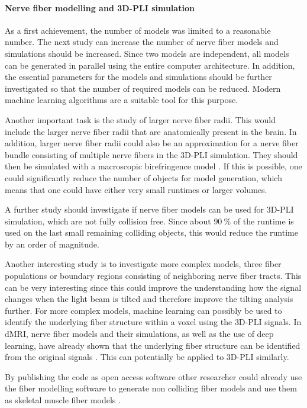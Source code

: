 \paragraph{Nerve fiber modelling and \ac{3D-PLI} simulation}
% 
As a first achievement, the number of models was limited to a reasonable number.
The next study can increase the number of nerve fiber models and simulations should be increased.
Since two models are independent, all models can be generated in parallel using the entire computer architecture.
In addition, the essential parameters for the models and simulations should be further investigated so that the number of required models can be reduced.
Modern machine learning algorithms are a suitable tool for this purpose.
\par
% 
Another important task is the study of larger nerve fiber radii.
This would include the larger nerve fiber radii that are anatomically present in the brain.
In addition, larger nerve fiber radii could also be an approximation for a nerve fiber bundle consisting of multiple nerve fibers in the \ac{3D-PLI} simulation.
They should then be simulated with a macroscopic birefringence model \cite{Menzel2015}.
If this is possible, one could significantly reduce the number of objects for model generation, which means that one could have either very small runtimes or larger volumes.
\par
% 
A further study should investigate if nerve fiber models can be used for \ac{3D-PLI} simulation, which are not fully collision free.
Since about $\SI{90}{\percent}$ of the runtime is used on the last small remaining colliding objects, this would reduce the runtime by an order of magnitude.
\par
% 
Another interesting study is to investigate more complex models, \eg{} three fiber populations or boundary regions consisting of neighboring nerve fiber tracts.
This can be very interesting since this could improve the understanding how the signal changes when the light beam is tilted and therefore improve the tilting analysis further.
For more complex models, machine learning can possibly be used to identify the underlying fiber structure within a voxel using the \ac{3D-PLI} signals. 
In \ac{dMRI}, nerve fiber models and their simulations, as well as the use of deep learning, have already shown that the underlying fiber structure can be identified from the original signals \cite{ginsburgerDis2019}.
This can potentially be applied to \ac{3D-PLI} similarly.
\par
% 
By publishing the code as open access software other researcher could already use the fiber modelling software to generate non colliding fiber models and use them as skeletal muscle fiber models \cite{Ji2021}.